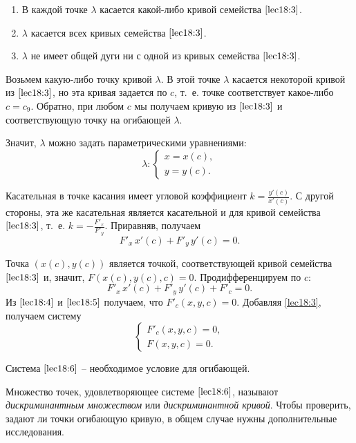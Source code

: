 \documentclass[../../main.tex]{subfiles}
\begin{document}
\begin{enumerate}
	\item В каждой точке $\lambda$ касается какой-либо кривой семейства 
	$\eqref{lec18:3}$.
	\item $\lambda$ касается всех кривых семейства $\eqref{lec18:3}$.
	\item $\lambda$ не имеет общей дуги ни с одной из кривых семейства 
	$\eqref{lec18:3}$.
\end{enumerate}

Возьмем какую-либо точку кривой $\lambda$. В этой точке $\lambda$ касается 
некоторой кривой из $\eqref{lec18:3}$, но эта кривая задается по $c$, 
т.~е. точке соответствует какое-либо $c = c_9$. Обратно, при любом $c$ мы 
получаем 
кривую из $\eqref{lec18:3}$ и соответствующую точку на огибающей $\lambda$.

Значит, $\lambda$ можно задать параметрическими уравнениями:
\[ \lambda: \begin{cases}
x=x\left( c \right), \\
y=y\left( c \right). 
\end{cases} \]

Касательная в точке касания имеет угловой коэффициент
$k = \frac{y' \left( c \right) }{ x' \left( c \right) }$.
С другой стороны, эта же касательная является касательной и для кривой 
семейства $\eqref{lec18:3}$, т.~е.
$k = - \frac{F'_x}{ F'_y}$.
Приравняв, получаем
\begin{equation}\label{lec18:4} F'_x\,x'(c) + F'_y\,y'(c) = 0.
\end{equation}

Точка $\left( x(c), y(c) \right) $ является точкой, 
соответствующей кривой семейства $\eqref{lec18:3}$ и, значит, $F(x(
c), y(c), c) = 0$.
Продифференцируем по $c$:
\begin{equation}\label{lec18:5} F'_x\, x'(c) + F'_y\,y'(c) + F'_c = 0. 
\end{equation}
Из $\eqref{lec18:4}$ и $\eqref{lec18:5}$ получаем, что $F'_c\left(x,y,c\right) 
= 0$. Добавляя \eqref{lec18:3}, получаем систему
\begin{equation}\label{lec18:6} \begin{cases}
F'_c\left(x,y,c\right) = 0,\\
F(x,y,c)  = 0.
\end{cases}  \end{equation}

Система $\eqref{lec18:6}$ \--- необходимое условие для огибающей.

Множество точек, удовлетворяющее системе $\eqref{lec18:6}$, называют 
\emph{дискриминантным множеством} или
\emph{дискриминантной кривой}.
Чтобы проверить, задают ли точки огибающую кривую, в общем случае нужны 
дополнительные исследования.
\end{document}
